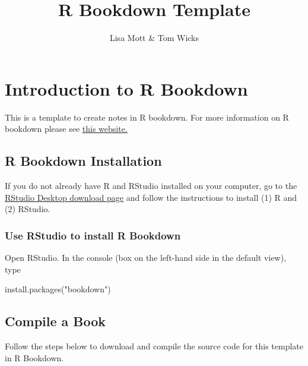 \documentclass[
  letterpaper,
]{article}
\title{R Bookdown Template}
\author{Lisa Mott \& Tom Wicks}
\date{}
\newenvironment{Shaded}{\begin{snugshade}}{\end{snugshade}}
\newcommand{\FunctionTok}[1]{\textcolor[rgb]{0.28,0.35,0.67}{#1}}
\newcommand{\NormalTok}[1]{\textcolor[rgb]{0.00,0.23,0.31}{#1}}
\newcommand{\StringTok}[1]{\textcolor[rgb]{0.13,0.47,0.30}{#1}}
\numberwithin{equation}{section}
\numberwithin{figure}{section}
\theoremstyle{break}
\renewcommand*\contentsname{Table of contents}
\newcommand\contentsname{Table of contents}
\begin{document}
\maketitle

\renewcommand*\contentsname{Table of contents}
{
\hypersetup{linkcolor=}
\setcounter{tocdepth}{2}
\tableofcontents
}


\section{Introduction to R Bookdown}\label{introduction-to-r-bookdown}

This is a template to create notes in R bookdown. For more information
on R bookdown please see
\href{https://bookdown.org/yihui/bookdown/?target=_blank}{this website.}

\subsection{R Bookdown Installation}\label{r-bookdown-installation}

If you do not already have R and RStudio installed on your computer, go
to the
\href{https://posit.co/download/rstudio-desktop/?target=_blank}{RStudio
Desktop download page} and follow the instructions to install (1) R and
(2) RStudio.

\subsubsection*{Use RStudio to install R
Bookdown}\label{use-rstudio-to-install-r-bookdown}

Open RStudio. In the console (box on the left-hand side in the default
view), type

\begin{Shaded}
\begin{Highlighting}[]
\FunctionTok{install.packages}\NormalTok{(}\StringTok{"bookdown"}\NormalTok{)}
\end{Highlighting}
\end{Shaded}

\subsection{Compile a Book}\label{compile-a-book}

Follow the steps below to download and compile the source code for this
template in R Bookdown.
\end{document}
